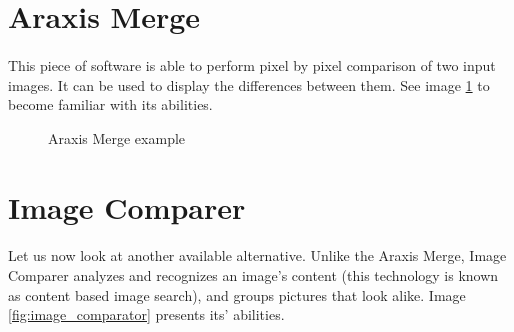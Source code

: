 \section{Araxis Merge}
\paragraph{}
This piece of software is able to perform pixel by pixel comparison of two input images. It can be used to display the differences between them. See image \ref{fig:araxis_input_output} to become familiar with its abilities.

\begin{figure}[H]
     \centering
     \qquad
     \caption{Araxis Merge example}
     \label{fig:araxis_input_output}
\end{figure}

\section{Image Comparer}
\paragraph{}
Let us now look at another available alternative. Unlike the Araxis Merge, Image Comparer analyzes and recognizes an image's content (this technology is known as content based image search), and groups pictures that look alike. Image \ref{fig:image_comparator} presents its' abilities.

